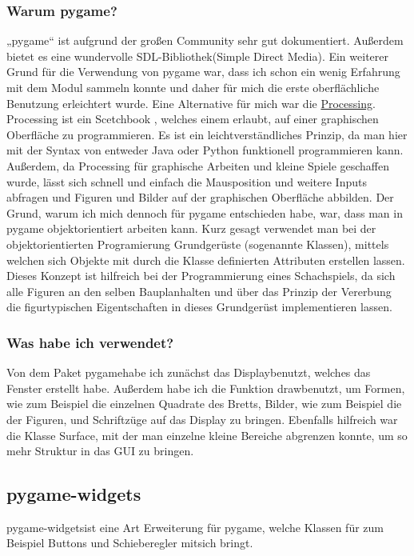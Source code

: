 \documentclass[a4paper, 10pt]{scrartcl}
\begin{document}
\subsubsection{Warum pygame?}
„pygame“ ist aufgrund der großen Community sehr gut dokumentiert.
Außerdem bietet es eine wundervolle SDL-Bibliothek(Simple Direct Media).
Ein weiterer Grund für die Verwendung von pygame war, dass ich schon ein
wenig Erfahrung mit dem Modul sammeln konnte und daher für mich die erste
oberflächliche Benutzung erleichtert wurde.
Eine Alternative für mich war die \href{https://processing.org/}{Processing}.
Processing ist ein \glqq Scetchbook \grqq , welches einem erlaubt,
auf einer graphischen Oberfläche zu programmieren. Es ist ein leichtverständliches
Prinzip, da man hier mit der Syntax von entweder Java oder Python funktionell programmieren
kann. Außerdem, da Processing für graphische Arbeiten und kleine Spiele geschaffen wurde,
lässt sich schnell und einfach die Mausposition und weitere Inputs abfragen und
Figuren und Bilder auf der graphischen Oberfläche abbilden.
Der Grund, warum ich mich dennoch für pygame entschieden habe, war, dass man in pygame
objektorientiert arbeiten kann. Kurz gesagt verwendet man bei der objektorientierten Programierung
Grundgerüste (sogenannte Klassen), mittels welchen sich Objekte mit durch die Klasse definierten Attributen
erstellen lassen. Dieses Konzept ist hilfreich bei der Programmierung eines Schachspiels,
da sich alle Figuren an den selben \glqq Bauplan\grqq  halten und über das Prinzip der Vererbung
die figurtypischen Eigentschaften in dieses Grundgerüst implementieren lassen.

\subsubsection{Was habe ich verwendet?}
Von dem Paket \glqq pygame\grqq habe ich zunächst das \glqq Display\grqq benutzt, welches das Fenster erstellt habe. Außerdem habe ich
die Funktion \glqq draw\grqq benutzt, um Formen, wie zum Beispiel die einzelnen Quadrate des Bretts, Bilder, wie zum Beispiel die der Figuren,
und Schriftzüge auf das Display zu bringen. Ebenfalls hilfreich war die Klasse \glqq Surface\grqq , mit der man einzelne kleine Bereiche abgrenzen konnte,
um so mehr Struktur in das GUI zu bringen.  

\subsection{pygame-widgets}
\glqq pygame-widgets\grqq ist eine Art Erweiterung für pygame, welche Klassen für zum Beispiel Buttons und Schieberegler mitsich bringt.
\end{document}
